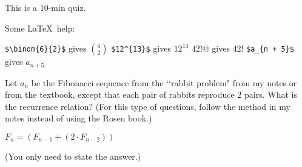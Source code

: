 

\renewcommand\AUTHOR{nweadick1@cougars.ccis.edu} %


\topmattertwo

This is a 10-min quiz.

Some \LaTeX\ help:
\begin{enumerate}[nosep]
\li \verb!$\binom{6}{2}$! gives $\binom{6}{2}$
\li \verb!$12^{13}$! gives $12^{13}$
\li \verb@$42!$@ gives $42!$
\li \verb!$a_{n + 5}$! gives $a_{n + 5}$
\end{enumerate}

\nextq
Let $a_n$ be the Fibonacci sequence from the \lq\lq rabbit problem" from my
notes or from the textbook, except that each pair of rabbits reproduce
2 pairs.
What is the recurrence relation?
(For this type of questions, follow the method in my notes instead of
using the Rosen book.)
\\
\ANSWER
\begin{answerlong}
$ F_n = (F_{n-1} + (2 \cdot F_{n-2}))$
\end{answerlong}
(You only need to state the answer.)

\newpage


